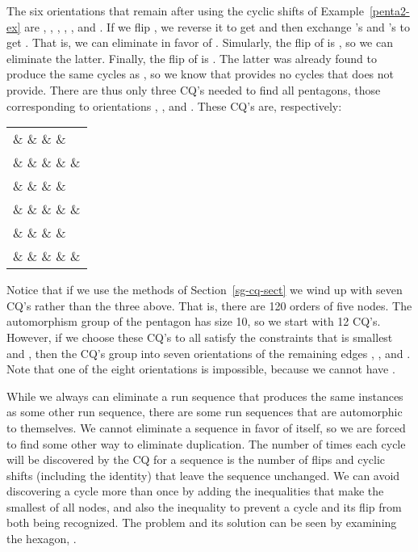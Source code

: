 \begin{example}
\label{penta3-ex}
The six orientations that remain after using the cyclic shifts of Example~\ref{penta2-ex} are , , , , , and .
If we flip , we reverse it to get  and then exchange 's and 's to get .  That is, we can eliminate  in favor of .  Simularly, the flip of  is , so we can eliminate the latter.  Finally, the flip of  is .  The latter was already found to produce the same cycles as , so we know that  provides no cycles that  does not provide.  There are thus only three CQ's needed to find all pentagons, those corresponding to orientations , , and .  These CQ's are, respectively:

\begin{center}
\begin{tabular}{l}
 \&  \&  \&  \& \\ \&  \&  \&  \&  \& \\
 \&  \&  \&  \& \\ \&  \&  \&  \&  \& \\
 \&  \&  \&  \& \\ \&  \&  \&  \&  \& \\
\end{tabular}
\end{center}

Notice that if we use the methods of Section~\ref{sg-cq-sect} we wind up with seven CQ's rather than the three above.  That is, there are 120 orders of five nodes.  The automorphism group of the pentagon has size 10, so we start with 12 CQ's.  However, if we choose these CQ's to all satisfy the constraints that  is smallest and , then the CQ's group into seven orientations of the remaining edges , , and .  Note that one of the eight orientations is impossible, because we cannot have .
\end{example}

While we always can eliminate a run sequence that produces the same instances as some other run sequence, there are some run sequences that are automorphic to themselves.  We cannot eliminate a sequence in favor of itself, so we are forced to find some other way to eliminate duplication.   The number of times each cycle will be discovered by the CQ for a sequence is the number of flips and cyclic shifts (including the identity) that leave the sequence unchanged.  We can avoid discovering a cycle more than once by adding the inequalities that make  the smallest of all nodes, and also the inequality  to prevent a cycle and its flip from both being recognized.  The problem and its solution can be seen by examining the hexagon, .

